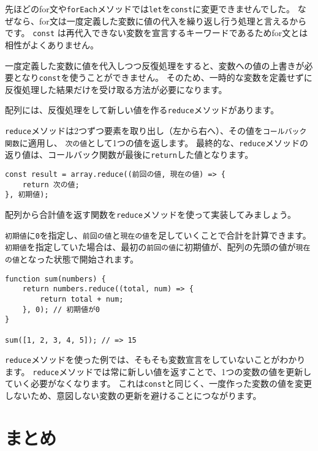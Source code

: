 \begin{tcolorbox}[title=\texttt{let}ではなく\texttt{const}で反復処理をする]\label{const-iteration}

先ほどのfor文や\texttt{forEach}メソッドでは\texttt{let}を\texttt{const}に変更できませんでした。
なぜなら、for文は一度定義した変数に値の代入を繰り返し行う処理と言えるからです。
\texttt{const}
は再代入できない変数を宣言するキーワードであるためfor文とは相性がよくありません。

一度定義した変数に値を代入しつつ反復処理をすると、変数への値の上書きが必要となり\texttt{const}を使うことができません。
そのため、一時的な変数を定義せずに反復処理した結果だけを受け取る方法が必要になります。

配列には、反復処理をして新しい値を作る\texttt{reduce}メソッドがあります。

\texttt{reduce}メソッドは2つずつ要素を取り出し（左から右へ）、その値を\texttt{コールバック関数}に適用し、
\texttt{次の値}として1つの値を返します。
最終的な、\texttt{reduce}メソッドの返り値は、コールバック関数が最後に\texttt{return}した値となります。

\begin{lstlisting}
const result = array.reduce((前回の値, 現在の値) => {
    return 次の値;
}, 初期値);
\end{lstlisting}

配列から合計値を返す関数を\texttt{reduce}メソッドを使って実装してみましょう。

\texttt{初期値}に\texttt{0}を指定し、\texttt{前回の値}と\texttt{現在の値}を足していくことで合計を計算できます。
\texttt{初期値}を指定していた場合は、最初の\texttt{前回の値}に初期値が、配列の先頭の値が\texttt{現在の値}となった状態で開始されます。

\begin{lstlisting}
function sum(numbers) {
    return numbers.reduce((total, num) => {
        return total + num;
    }, 0); // 初期値が0
}

sum([1, 2, 3, 4, 5]); // => 15
\end{lstlisting}

\texttt{reduce}メソッドを使った例では、そもそも変数宣言をしていないことがわかります。
\texttt{reduce}メソッドでは常に新しい値を返すことで、1つの変数の値を更新していく必要がなくなります。
これは\texttt{const}と同じく、一度作った変数の値を変更しないため、意図しない変数の更新を避けることにつながります。
\end{tcolorbox}

\hypertarget{conclusion}{%
\section{まとめ}\label{conclusion}}

